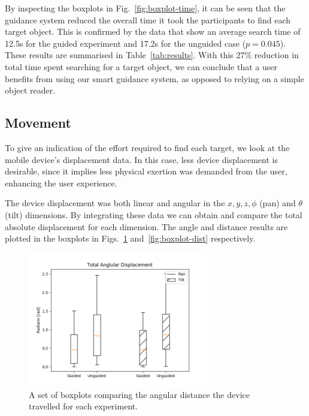 \documentclass[runningheads]{llncs}
\newcommand\todo[1]{\textcolor{red}{#1}}
\begin{document}

By inspecting the boxplots in Fig.~\ref{fig:boxplot-time}, it can be seen that the guidance system reduced the overall time it took the participants to find each target object.
This is confirmed by the data that show an average search time of 12.5s for the guided experiment and 17.2s for the unguided case ($p=0.045$).
These results are summarised in Table~\ref{tab:results}. 
With this 27\% reduction in total time spent searching for a target object, we can conclude that a user benefits from using our smart guidance system, as opposed to relying on a simple object reader. 

\subsection{Movement}

To give an indication of the effort required to find each target, we look at the mobile device's displacement data. 
In this case, less device displacement is desirable, since it implies less physical exertion was demanded from the user, enhancing the user experience.

The device displacement was both linear and angular in the $x, y, z, \phi$ (pan) and $\theta$ (tilt) dimensions.
By integrating these data we can obtain and compare the total absolute displacement for each dimension.
The angle and distance results are plotted in the boxplots in Figs.~\ref{fig:boxplot-angle} and~\ref{fig:boxplot-dist} respectively. 

\begin{figure}
  \centering
  \includegraphics[width=0.7\textwidth]{figures/boxplot_angle.png}
  \caption{A set of boxplots comparing the angular distance the device travelled for each experiment. }\label{fig:boxplot-angle}
\end{figure}
\end{document}

